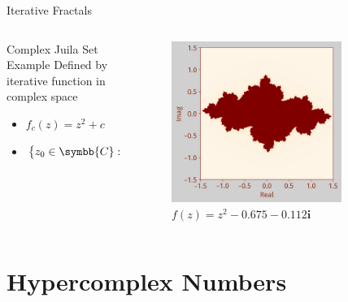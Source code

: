 \documentclass[aspectratio=169,t]{beamer}
\DeclarePairedDelimiter\abs{\lvert}{\rvert} %
\begin{document}
\begin{frame}[label={sec:org13284c0}]{Iterative Fractals}
\begin{columns}
\begin{column}{0.55\columnwidth}
\begin{block}{Complex Juila Set Example}
Defined by iterative function in complex space

\begin{itemize}
\item \(f_c (z) = z^2 + c\)

\item \(\left\{ z_0 \in \symbb{C}: \abs{f^k_c \left(z_0 \right)} \in \symbb{C} \text{ as } k \to \infty\right\} \in K_c\)
\end{itemize}
\end{block}
\end{column}

\begin{column}{0.45\columnwidth}
\begin{figure}[htbp]
\centering
\includegraphics[width=0.80\textwidth]{./Figs/Fig_2v2.png}
\caption{\(f(z) = z^2 -0.675 - 0.112\symbf{i}\)}
\end{figure}
\end{column}
\end{columns}
\end{frame}

\section{Hypercomplex Numbers}
\label{sec:orgf4b76ec}
\end{document}
